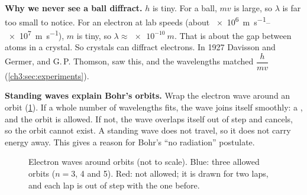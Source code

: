 \textbf{Why we never see a ball diffract.} $h$ is tiny. For a ball, $mv$ is large, so
$\lambda$ is far too small to notice. For an electron at lab speeds (about
\qtyrange{e6}{e7}{m.s^{-1}}), $m$ is tiny, so $\lambda \approx \qty{e-10}{m}$. That is about
the gap between atoms in a crystal. So crystals can diffract electrons. In 1927 Davisson and
Germer, and G.\,P. Thomson, saw this, and the wavelengths matched $\dfrac{h}{mv}$
(\cref{ch3:sec:experiments}).

\textbf{Standing waves explain Bohr's orbits.} Wrap the electron wave around an orbit
(\cref{ch3:fig:orbitwaves}). If a whole number of wavelengths fits, the wave joins itself
smoothly: a , and the orbit is allowed. If not, the wave overlaps itself out
of step and cancels, so the orbit cannot exist. A standing wave does not travel, so it does not
carry energy away. This gives a reason for Bohr's ``no radiation'' postulate.

\begin{figure}
  \centering
  \caption{Electron waves around orbits (not to scale). Blue: three allowed orbits
    ($n = 3$, 4 and 5). Red: not allowed; it is drawn for two laps, and each lap is out of step
    with the one before.}
  \label{ch3:fig:orbitwaves}
\end{figure}

